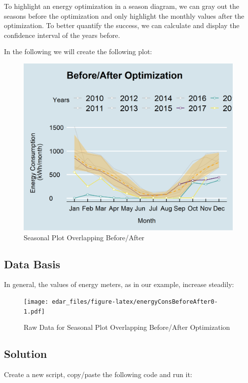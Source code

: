 \documentclass[
]{book}
\begin{document}
To highlight an energy optimization in a season diagram, we can gray out the seasons before the optimization and only highlight the monthly values after the optimization. To better quantify the success, we can calculate and display the confidence interval of the years before.

In the following we will create the following plot:

\begin{figure}
\includegraphics[width=0.7\linewidth]{images/plotEnergyConsBeforeAfter} \caption{Seasonal Plot Overlapping Before/After}\label{fig:unnamed-chunk-12}
\end{figure}

\hypertarget{data-basis-3}{%
\subsection{Data Basis}\label{data-basis-3}}

In general, the values of energy meters, as in our example, increase steadily:

\begin{figure}
\centering
\texttt{[image: edar\_files/figure-latex/energyConsBeforeAfter0-1.pdf]}
\caption{\label{fig:energyConsBeforeAfter0}Raw Data for Seasonal Plot Overlapping Before/After Optimization}
\end{figure}

\hypertarget{solution-3}{%
\subsection{Solution}\label{solution-3}}

Create a new script, copy/paste the following code and run it:
\end{document}
